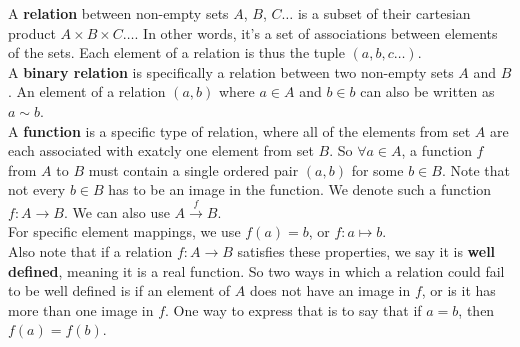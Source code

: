 \documentclass[12pt]{article}
\begin{document}
    A \textbf{relation} between non-empty sets
    $A$, $B$, $C \dots$ is a subset
    of their cartesian product $A \times B \times C \dots$.
    In other words, it's a set of associations between elements
    of the sets.
    Each element of a relation is thus the tuple $(a, b, c \dots)$. \\
    A \textbf{binary relation}
    is specifically a relation between two non-empty sets $A$ and $B$.
    An element of a relation $(a, b)$ where $a \in A$ and $b \in b$
    can also be written as $a \sim b$. \\

    A \textbf{function} is a specific type of relation, 
    where all of the elements from set $A$
    are each associated with exatcly one element from set $B$.
    So $\forall a \in A$,
    a function $f$ from $A$ to $B$
    must contain a single ordered pair $(a, b)$ for some $b \in B$.
    Note that not every $b \in B$ has to be an image in the function.
    We denote such a function $f: A \rightarrow B$.
    We can also use $A \stackrel{f}{\rightarrow} B$. \\
    For specific element mappings,
    we use $f(a) = b$, or $f: a \mapsto b$. \\
    Also note that if a relation  $f: A \rightarrow B$
    satisfies these properties,
    we say it is \textbf{well defined},
    meaning it is a real function.
    So two ways in which a relation could fail to be well defined
    is if an element of $A$ does not have an image in $f$,
    or is it has more than one image in $f$.
    One way to express that is to say that
    if $a = b$, then $f(a) = f(b)$.
\end{document}
